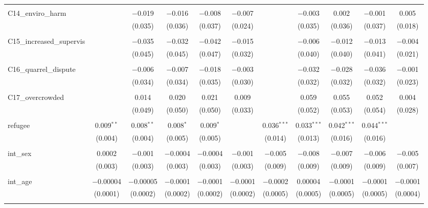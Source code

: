 \begin{table}[H]
\begin{tabular}{@{\extracolsep{4pt}}lcccccccccc}
  & & & & & & & & & & \\ 
 C14\_enviro\_harm &  & $-$0.019 & $-$0.016 & $-$0.008 & $-$0.007 &  & $-$0.003 & 0.002 & $-$0.001 & 0.005 \\ 
  &  & (0.035) & (0.036) & (0.037) & (0.024) &  & (0.035) & (0.036) & (0.037) & (0.018) \\ 
  & & & & & & & & & & \\ 
 C15\_increased\_supervis &  & $-$0.035 & $-$0.032 & $-$0.042 & $-$0.015 &  & $-$0.006 & $-$0.012 & $-$0.013 & $-$0.004 \\ 
  &  & (0.045) & (0.045) & (0.047) & (0.032) &  & (0.040) & (0.040) & (0.041) & (0.021) \\ 
  & & & & & & & & & & \\ 
 C16\_quarrel\_dispute &  & $-$0.006 & $-$0.007 & $-$0.018 & $-$0.003 &  & $-$0.032 & $-$0.028 & $-$0.036 & $-$0.001 \\ 
  &  & (0.034) & (0.034) & (0.035) & (0.030) &  & (0.032) & (0.032) & (0.032) & (0.023) \\ 
  & & & & & & & & & & \\ 
 C17\_overcrowded &  & 0.014 & 0.020 & 0.021 & 0.009 &  & 0.059 & 0.055 & 0.052 & 0.004 \\ 
  &  & (0.049) & (0.050) & (0.050) & (0.033) &  & (0.052) & (0.053) & (0.054) & (0.028) \\ 
  & & & & & & & & & & \\ 
 refugee & 0.009$^{**}$ & 0.008$^{**}$ & 0.008$^{*}$ & 0.009$^{*}$ &  & 0.036$^{***}$ & 0.033$^{***}$ & 0.042$^{***}$ & 0.044$^{***}$ &  \\ 
  & (0.004) & (0.004) & (0.005) & (0.005) &  & (0.014) & (0.013) & (0.016) & (0.016) &  \\ 
  & & & & & & & & & & \\ 
 int\_sex & 0.0002 & $-$0.001 & $-$0.0004 & $-$0.0004 & $-$0.001 & $-$0.005 & $-$0.008 & $-$0.007 & $-$0.006 & $-$0.005 \\ 
  & (0.003) & (0.003) & (0.003) & (0.003) & (0.003) & (0.009) & (0.009) & (0.009) & (0.009) & (0.007) \\ 
  & & & & & & & & & & \\ 
 int\_age & $-$0.00004 & $-$0.00005 & $-$0.0001 & $-$0.0001 & $-$0.0001 & $-$0.0002 & 0.00004 & $-$0.0001 & $-$0.0001 & $-$0.0001 \\ 
  & (0.0001) & (0.0002) & (0.0002) & (0.0002) & (0.0002) & (0.0005) & (0.0005) & (0.0005) & (0.0005) & (0.0004) \\ 
  & & & & & & & & & & \\ 

\end{tabular}
\end{table}

